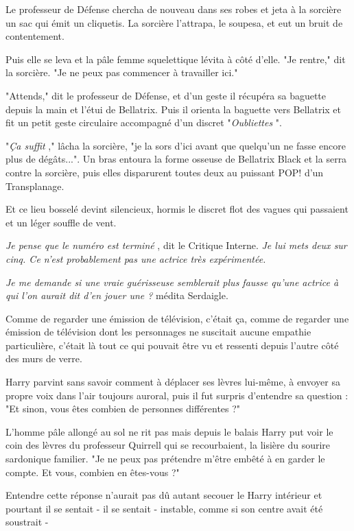 Le professeur de Défense chercha de nouveau dans ses robes et jeta à la sorcière un sac qui émit un cliquetis. La sorcière l'attrapa, le soupesa, et eut un bruit de contentement.

Puis elle se leva et la pâle femme squelettique lévita à côté d'elle. "Je rentre," dit la sorcière. "Je ne peux pas commencer à travailler ici."

"Attends," dit le professeur de Défense, et d'un geste il récupéra sa baguette depuis la main et l'étui de Bellatrix. Puis il orienta la baguette vers Bellatrix et fit un petit geste circulaire accompagné d'un discret "\emph{Oubliettes} ".

"\emph{Ça suffit} ," lâcha la sorcière, "je la sors d'ici avant que quelqu'un ne fasse encore plus de dégâts...". Un bras entoura la forme osseuse de Bellatrix Black et la serra contre la sorcière, puis elles disparurent toutes deux au puissant POP! d'un Transplanage.

Et ce lieu bosselé devint silencieux, hormis le discret flot des vagues qui passaient et un léger souffle de vent.

\emph{Je pense que le numéro est terminé} , dit le Critique Interne. \emph{Je lui mets deux sur cinq. Ce n'est probablement pas une actrice très expérimentée.} 

\emph{Je me demande si une vraie guérisseuse semblerait plus fausse qu'une actrice à qui l'on aurait dit d'en jouer une ? } médita Serdaigle.

Comme de regarder une émission de télévision, c'était ça, comme de regarder une émission de télévision dont les personnages ne suscitait aucune empathie particulière, c'était là tout ce qui pouvait être vu et ressenti depuis l'autre côté des murs de verre.

Harry parvint sans savoir comment à déplacer ses lèvres lui-même, à envoyer sa propre voix dans l'air toujours auroral, puis il fut surpris d'entendre sa question : "Et sinon, vous êtes combien de personnes différentes ?"

L'homme pâle allongé au sol ne rit pas mais depuis le balais Harry put voir le coin des lèvres du professeur Quirrell qui se recourbaient, la lisière du sourire sardonique familier. "Je ne peux pas prétendre m'être embêté à en garder le compte. Et vous, combien en êtes-vous ?"

Entendre cette réponse n'aurait pas dû autant secouer le Harry intérieur et pourtant il se sentait - il se sentait - instable, comme si son centre avait été soustrait -

